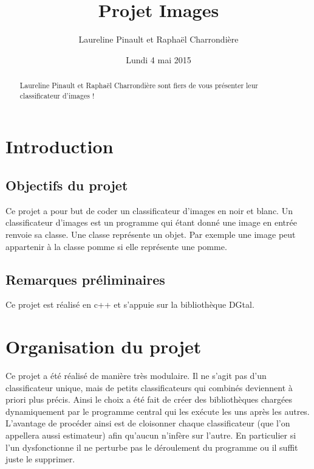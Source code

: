 \documentclass{article}
\title{Projet Images}
\author[$\dag$]{Laureline Pinault et Raphaël Charrondière}
\affil[$\dag$]{ENS de Lyon, France}
\date{Lundi 4 mai 2015}
\theoremstyle{definition}
\begin{document}
  \maketitle

  \begin{abstract}
	Laureline Pinault et Raphaël Charrondière sont fiers de vous présenter leur classificateur d'images !
  \end{abstract}
  
  \newpage

  \tableofcontents

  \newpage
  
  \section{Introduction}

    \subsection{Objectifs du projet}
    	Ce projet a pour but de coder un classificateur d'images en noir et blanc. Un classificateur d'images est un programme qui étant donné une image en entrée renvoie sa classe. Une classe représente un objet. Par exemple une image peut appartenir à la classe pomme si elle représente une pomme.

    \subsection{Remarques préliminaires}    	
    	Ce projet est réalisé en c++  et s'appuie sur la bibliothèque DGtal.
    	  
  \section{Organisation du projet} %
  	Ce projet a été réalisé de manière très modulaire. Il ne s'agit pas d'un classificateur unique, mais de petits classificateurs qui combinés deviennent à priori plus précis. Ainsi le choix a été fait de créer des bibliothèques chargées dynamiquement par le programme central qui les exécute les uns après les autres. L'avantage de procéder ainsi est de cloisonner chaque classificateur (que l'on appellera aussi estimateur) afin qu'aucun n'infère sur l'autre. En particulier si l'un dysfonctionne il ne perturbe pas le déroulement du programme ou il suffit juste le supprimer.
  	   
\end{document}
